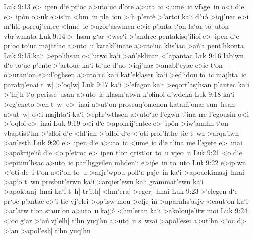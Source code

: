 \vs Luk 9:13
e>~ipen
d`e
pr`oc
a>uto`uc
d'ote
a>uto~ic
<ume~ic
vfage~in
o<i
d`e
e>~ip\r{o}n
o>uk
e>is`in
<hm~in
ple~ion
>`h
p'ente\r{}
>'artoi
ka`i
d'uo\r{}
>iqj'uec
e>i
m'hti
poreuj'entec
<hme~ic
>agor'aswmen
e>ic
p'anta
t`on
la`on
to~uton
vbr'wmata\bibvsend
\vs Luk 9:14
>~hsan
g`ar
<wse`i
>'andrec
pentakisq'ilioi
e>~ipen
d`e
pr`oc
to`uc
majht`ac
a>uto~u
katakl'inate
a>uto`uc
klis'iac
>a\r{n}`a
pent'hkonta\bibvsend
\vs Luk 9:15
ka`i
>epo'ihsan
o<'utwc
ka`i
>a\r{n}'eklinan
<'apantac\bibvsend
\vs Luk 9:16
lab`wn
d`e
to`uc
p'ente
>'artouc
ka`i
to`uc
d'uo
>iqj'uac
>anabl'eyac
e>ic
t`on
o>uran`on
e>ul'oghsen
a>uto`uc
ka`i
kat'eklasen
ka`i
>ed'idou
to~ic
majhta~ic
para\r{t}ij'enai
t~w|
>'oqlw|\bibvsend
\vs Luk 9:17
ka`i
>'efagon
ka`i
>eqort'asjhsan
p'antec
ka`i
>'hrjh
t`o
perisse~usan
a>uto~ic
klasm'atwn
k'ofinoi
d'wdeka\bibvsend
\vs Luk 9:18
ka`i
>eg'eneto
>en
t~w|
e>~inai
a>ut`on
proseuq'omenon
kata\r{m}'onac
sun~hsan
a>ut~w|
o<i
majhta`i
ka`i
>ephr'wthsen
a>uto`uc
l'egwn
t'ina
me
l'egousin
o<i
>'oqloi
e>~inai\bibvsend
\vs Luk 9:19
o<i
d`e
>apokrij'entec
e>~ip\r{o}n
>iw'annhn
t`on
vbaptist`hn
>'alloi
d`e
<hl'ian
>'alloi
d`e
<'oti
prof'hthc
tic
t~wn
>arqa'iwn
>an'esth\bibvsend
\vs Luk 9:20
e>~ipen
d`e
a>uto~ic
<ume~ic
d`e
t'ina
me
l'egete
e>~inai
>apokrije`ic\r{}
d`e
<o
p'etroc
e>~ipen
t`on
qrist`on
to~u
vjeo~u\bibvsend
\vs Luk 9:21
<o
d`e
>epitim'hsac
a>uto~ic
par'hggeilen
mhden`i
e>i\r{p}e~in
to~uto\bibvsend
\vs Luk 9:22
e>ip`wn
<'oti
de~i
t`on
u<i`on
to~u
>anjr'wpou
poll`a
paje~in
ka`i
>apodokimasj~hnai
>ap`o
t~wn
presbut'erwn
ka`i
>arqier'ewn
ka`i
grammat'ewn
ka`i
>apoktanj~hnai
ka`i
t~h|
tr'ith|
<hm'era|
>egerj~hnai\bibvsend
\vs Luk 9:23
>'elegen
d`e
pr`oc
p'antac
e>'i
tic
vj'elei
>op'isw
mou
>elje~in\r{}
>aparnhs'asjw
<eaut`on
ka`i
>ar'atw
t`on
staur`on
a>uto~u
kaj>\r{}
<hm'eran
ka`i
>akolouje'itw
moi\bibvsend
\vs Luk 9:24
<`oc
g`ar
>`a\r{n}
vj'elh|
t`hn
yuq`hn
a>uto~u
s~wsai
>apol'esei
a>ut`hn
<`oc
d>
>`an
>apol'esh|
t`hn
yuq`hn
